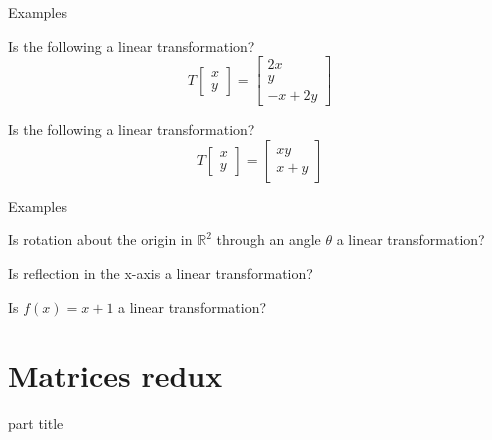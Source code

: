 \documentclass{beamer}
\begin{document}
\begin{frame}{Examples}
\begin{example}
Is the following a linear transformation?
\begin{equation*}
T \left[
\begin{array}{c}
x\\
y
\end{array}
\right] = \left[
\begin{array}{c}
2x\\
y\\
-x+2y
\end{array}
\right]
\end{equation*}
\end{example}
\begin{example}
Is the following a linear transformation?
\begin{equation*}
T \left[
\begin{array}{c}
x\\
y
\end{array}
\right] = \left[
\begin{array}{c}
xy\\
x+y
\end{array}
\right]
\end{equation*}
\end{example}
\end{frame}

\begin{frame}{Examples}
\begin{example}
Is rotation about the origin in $\mathbb{R}^2$ through an angle $\theta$ a linear transformation?
\end{example}
\begin{example}
Is reflection in the x-axis a linear transformation?
\end{example}
\begin{example}
Is $f(x) = x+1$ a linear transformation?
\end{example}
\end{frame}

\section{Matrices redux}

\begin{frame}
\begin{beamercolorbox}[sep=12pt,center]{part title}
\insertsection\par
\end{beamercolorbox}
\end{frame}
\end{document}
